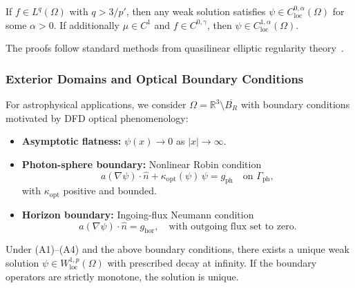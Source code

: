 \begin{theorem}[Regularity]\label{thm:static-regularity-U}
If $f \in L^q(\Omega)$ with $q > 3/p'$, then any weak solution satisfies 
$\psi \in C^{0,\alpha}_{\mathrm{loc}}(\Omega)$ for some $\alpha > 0$. 
If additionally $\mu \in C^1$ and $f \in C^{0,\gamma}$, then 
$\psi \in C^{1,\alpha}_{\mathrm{loc}}(\Omega)$.
\end{theorem}

The proofs follow standard methods from quasilinear elliptic regularity 
theory~\cite{GilbargTrudinger,LadyzhenskayaUraltseva}.

\subsubsection{Exterior Domains and Optical Boundary Conditions}

For astrophysical applications, we consider $\Omega = \mathbb{R}^3 \setminus \overline{B_R}$ 
with boundary conditions motivated by DFD optical phenomenology:

\begin{itemize}
\item \textbf{Asymptotic flatness:} $\psi(x) \to 0$ as $|x| \to \infty$.

\item \textbf{Photon-sphere boundary:} Nonlinear Robin condition
\begin{equation}
a(\nabla\psi) \cdot \hat{n} + \kappa_{\mathrm{opt}}(\psi)\,\psi = g_{\mathrm{ph}} 
\quad \text{on } \Gamma_{\mathrm{ph}},
\end{equation}
with $\kappa_{\mathrm{opt}}$ positive and bounded.

\item \textbf{Horizon boundary:} Ingoing-flux Neumann condition
\begin{equation}
a(\nabla\psi) \cdot \hat{n} = g_{\mathrm{hor}}, \quad \text{with outgoing flux set to zero}.
\end{equation}
\end{itemize}

\begin{theorem}\label{thm:exterior-U}
Under (A1)--(A4) and the above boundary conditions, there exists a unique 
weak solution $\psi \in W^{1,p}_{\mathrm{loc}}(\Omega)$ with prescribed decay 
at infinity. If the boundary operators are strictly monotone, the solution is unique.
\end{theorem}

